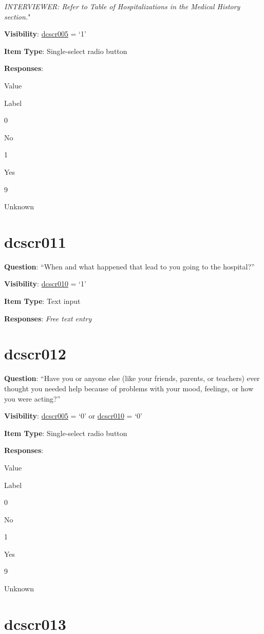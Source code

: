 \documentclass[]{book}
\begin{document}
\emph{INTERVIEWER: Refer to Table of Hospitalizations in the Medical History section.}"

\textbf{Visibility}: \protect\hyperlink{dcscr005}{dcscr005} = `1'

\textbf{Item Type}: Single-select radio button

\textbf{Responses}:

Value

Label

0

No

1

Yes

9

Unknown

\hypertarget{dcscr011}{%
\section{dcscr011}\label{dcscr011}}

\textbf{Question}: ``When and what happened that lead to you going to the hospital?''

\textbf{Visibility}: \protect\hyperlink{dcscr010}{dcscr010} = `1'

\textbf{Item Type}: Text input

\textbf{Responses}: \emph{Free text entry}

\hypertarget{dcscr012}{%
\section{dcscr012}\label{dcscr012}}

\textbf{Question}: ``Have you or anyone else (like your friends, parents, or teachers) ever thought you needed help because of problems with your mood, feelings, or how you were acting?''

\textbf{Visibility}: \protect\hyperlink{dcscr005}{dcscr005} = `0' or \protect\hyperlink{dcscr010}{dcscr010} = `0'

\textbf{Item Type}: Single-select radio button

\textbf{Responses}:

Value

Label

0

No

1

Yes

9

Unknown

\hypertarget{dcscr013}{%
\section{dcscr013}\label{dcscr013}}
\end{document}
